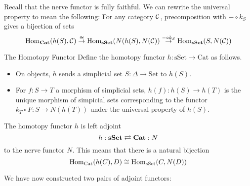 \documentclass[a4paper]{article}
\begin{document}
Recall that the nerve functor is fully faithful. We can rewrite the universal property to mean the following: For any category $\mathcal{C}$, precomposition with $-\circ k_S$ gives a bijection of sets $$\operatorname{Hom}_\bold{Cat}(h(S),\mathcal{C})\overset{\cong}{\rightarrow}\operatorname{Hom}_\bold{sSet}(N(h(S),N(\mathcal{C}))\overset{-\circ k_S}{\rightarrow}\operatorname{Hom}_\bold{sSet}(S,N(\mathcal{C}))$$

\begin{defn}{The Homotopy Functor}{} Define the homotopy functor $h:\text{sSet}\to\text{Cat}$ as follows. 
\begin{itemize}
\item On objects, $h$ sends a simplicial set $S:\Delta\to\text{Set}$ to $h(S)$. 
\item For $f:S\to T$ a morphism of simplicial sets, $h(f):h(S)\to h(T)$ is the unique morphism of simpicial sets corresponding to the functor $k_T\circ F:S\to N(h(T))$ under the universal property of $h(S)$. 
\end{itemize}
\end{defn}

\begin{thm}{}{} The homotopy functor $h$ is left adjoint $$h:\bold{sSet}\rightleftarrows\bold{Cat}:N$$ to the nerve functor $N$. This means that there is a natural bijection $$\operatorname{Hom}_\text{Cat}(h(C),D)\cong\operatorname{Hom}_\text{sSet}(C,N(D))$$
\end{thm}

We have now constructed two pairs of adjoint functors: \\~\\
\\~\\
\end{document}
